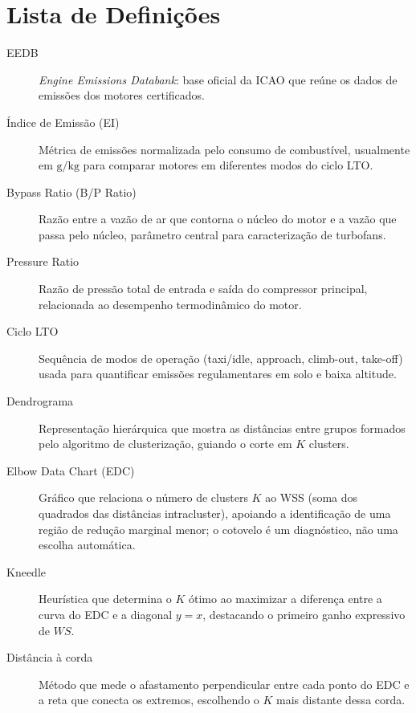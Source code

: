 \documentclass[12pt]{article} %
\begin{document}
	
	\newpage
	\pagestyle{fancy}
	\thispagestyle{empty}
	\section*{Lista de Definições}
    \begin{description}
        \item[EEDB] \textit{Engine Emissions Databank}: base oficial da ICAO que reúne os dados de emissões dos motores certificados.
        
        \item[Índice de Emissão (EI)] Métrica de emissões normalizada pelo consumo de combustível, usualmente em $ \mathrm{g/kg} $ para comparar motores em diferentes modos do ciclo LTO.
        
        \item[Bypass Ratio (B/P Ratio)] Razão entre a vazão de ar que contorna o núcleo do motor e a vazão que passa pelo núcleo, parâmetro central para caracterização de turbofans.
        
        \item[Pressure Ratio] Razão de pressão total de entrada e saída do compressor principal, relacionada ao desempenho termodinâmico do motor.
        
        \item[Ciclo LTO] Sequência de modos de operação (taxi/idle, approach, climb-out, take-off) usada para quantificar emissões regulamentares em solo e baixa altitude.
        
        \item[Dendrograma] Representação hierárquica que mostra as distâncias entre grupos formados pelo algoritmo de clusterização, guiando o corte em $ K $ clusters.
        
        \item[Elbow Data Chart (EDC)] Gráfico que relaciona o número de clusters $ K $ ao WSS (soma dos quadrados das distâncias intracluster), apoiando a identificação de uma região de redução marginal menor; o cotovelo é um diagnóstico, não uma escolha automática.
        
        \item[Kneedle] Heurística que determina o $ K $ ótimo ao maximizar a diferença entre a curva do EDC e a diagonal $ y = x $, destacando o primeiro ganho expressivo de $ WS $.
        
        \item[Distância à corda] Método que mede o afastamento perpendicular entre cada ponto do EDC e a reta que conecta os extremos, escolhendo o $ K $ mais distante dessa corda.
        

\end{description}
\end{document}
